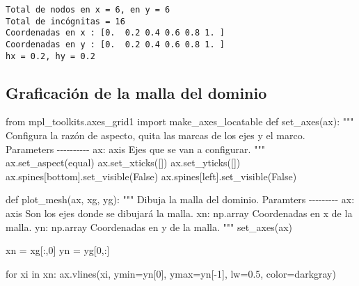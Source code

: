 \documentclass[
  letterpaper,
  DIV=11,
  numbers=noendperiod]{scrreprt}
\newenvironment{Shaded}{\begin{snugshade}}{\end{snugshade}}
\newcommand{\CommentTok}[1]{\textcolor[rgb]{0.37,0.37,0.37}{#1}}
\newcommand{\ControlFlowTok}[1]{\textcolor[rgb]{0.00,0.23,0.31}{#1}}
\newcommand{\DecValTok}[1]{\textcolor[rgb]{0.68,0.00,0.00}{#1}}
\newcommand{\FloatTok}[1]{\textcolor[rgb]{0.68,0.00,0.00}{#1}}
\newcommand{\ImportTok}[1]{\textcolor[rgb]{0.00,0.46,0.62}{#1}}
\newcommand{\KeywordTok}[1]{\textcolor[rgb]{0.00,0.23,0.31}{#1}}
\newcommand{\NormalTok}[1]{\textcolor[rgb]{0.00,0.23,0.31}{#1}}
\newcommand{\OperatorTok}[1]{\textcolor[rgb]{0.37,0.37,0.37}{#1}}
\newcommand{\StringTok}[1]{\textcolor[rgb]{0.13,0.47,0.30}{#1}}
\newcommand{\VariableTok}[1]{\textcolor[rgb]{0.07,0.07,0.07}{#1}}
\begin{document}
\begin{verbatim}
Total de nodos en x = 6, en y = 6
Total de incógnitas = 16
Coordenadas en x : [0.  0.2 0.4 0.6 0.8 1. ]
Coordenadas en y : [0.  0.2 0.4 0.6 0.8 1. ]
hx = 0.2, hy = 0.2
\end{verbatim}

\subsection{Graficación de la malla del
dominio}\label{graficaciuxf3n-de-la-malla-del-dominio}

\begin{Shaded}
\begin{Highlighting}[]
\ImportTok{from}\NormalTok{ mpl\_toolkits.axes\_grid1 }\ImportTok{import}\NormalTok{ make\_axes\_locatable}
\KeywordTok{def}\NormalTok{ set\_axes(ax):}
    \CommentTok{"""}
\CommentTok{    Configura la razón de aspecto, quita las marcas de los ejes y el marco.}
\CommentTok{    }
\CommentTok{    Parameters}
\CommentTok{    {-}{-}{-}{-}{-}{-}{-}{-}{-}{-}}
\CommentTok{    ax: axis}
\CommentTok{    Ejes que se van a configurar.}
\CommentTok{    """}
\NormalTok{    ax.set\_aspect(}\StringTok{\textquotesingle{}equal\textquotesingle{}}\NormalTok{) }
\NormalTok{    ax.set\_xticks([])}
\NormalTok{    ax.set\_yticks([])}
\NormalTok{    ax.spines[}\StringTok{\textquotesingle{}bottom\textquotesingle{}}\NormalTok{].set\_visible(}\VariableTok{False}\NormalTok{)}
\NormalTok{    ax.spines[}\StringTok{\textquotesingle{}left\textquotesingle{}}\NormalTok{].set\_visible(}\VariableTok{False}\NormalTok{)}
    
\KeywordTok{def}\NormalTok{ plot\_mesh(ax, xg, yg):}
    \CommentTok{"""}
\CommentTok{    Dibuja la malla del dominio.}
\CommentTok{    }
\CommentTok{    Paramters}
\CommentTok{    {-}{-}{-}{-}{-}{-}{-}{-}{-}}
\CommentTok{    ax: axis}
\CommentTok{    Son los ejes donde se dibujará la malla.}
\CommentTok{    }
\CommentTok{    xn: np.array}
\CommentTok{    Coordenadas en x de la malla.}
\CommentTok{    }
\CommentTok{    yn: np.array}
\CommentTok{    Coordenadas en y de la malla.}
\CommentTok{    """}
\NormalTok{    set\_axes(ax)}
    
\NormalTok{    xn }\OperatorTok{=}\NormalTok{ xg[:,}\DecValTok{0}\NormalTok{]}
\NormalTok{    yn }\OperatorTok{=}\NormalTok{ yg[}\DecValTok{0}\NormalTok{,:]}
    
    \ControlFlowTok{for}\NormalTok{ xi }\KeywordTok{in}\NormalTok{ xn:}
\NormalTok{        ax.vlines(xi, ymin}\OperatorTok{=}\NormalTok{yn[}\DecValTok{0}\NormalTok{], ymax}\OperatorTok{=}\NormalTok{yn[}\OperatorTok{{-}}\DecValTok{1}\NormalTok{], lw}\OperatorTok{=}\FloatTok{0.5}\NormalTok{, color}\OperatorTok{=}\StringTok{\textquotesingle{}darkgray\textquotesingle{}}\NormalTok{)}
        

\end{Highlighting}
\end{Shaded}
\end{document}
